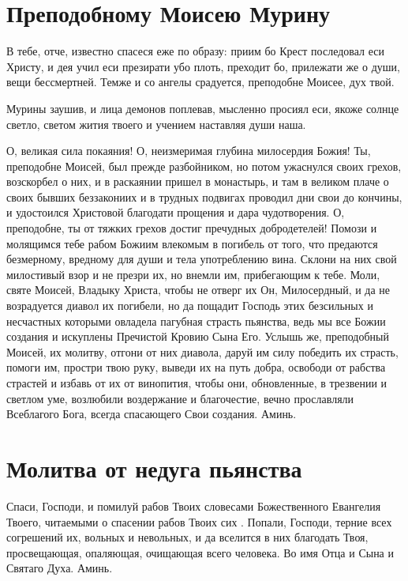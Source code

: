 \section{Преподобному Моисею Мурину}\begin{mymulticols}


В тебе, отче, известно спасеся еже по образу: приим бо Крест последовал еси Христу, и дея учил еси презирати убо плоть, преходит бо, прилежати же о души, вещи бессмертней. Темже и со ангелы срадуется, преподобне Моисее, дух твой.


Мурины заушив, и лица демонов поплевав, мысленно просиял еси, якоже солнце светло, светом жития твоего и учением наставляя души наша.


О, великая сила покаяния! О, неизмеримая глубина милосердия Божия! Ты, преподобне Моисей, был прежде разбойником, но потом ужаснулся своих грехов, возскорбел о них, и в раскаянии пришел в монастырь, и там в великом плаче о своих бывших беззакониих и в трудных подвигах проводил дни свои до кончины, и удостоился Христовой благодати прощения и дара чудотворения. О, преподобне, ты от тяжких грехов достиг пречудных добродетелей! Помози и молящимся тебе рабом Божиим  влекомым в погибель от того, что предаются безмерному, вредному для души и тела употреблению вина. Склони на них свой милостивый взор и не презри их, но внемли им, прибегающим к тебе. Моли, святе Моисей, Владыку Христа, чтобы не отверг их Он, Милосердный, и да не возрадуется диавол их погибели, но да пощадит Господь этих безсильных и несчастных  которыми овладела пагубная страсть пьянства, ведь мы все Божии создания и искуплены Пречистой Кровию Сына Его. Услышь же, преподобный Моисей, их молитву, отгони от них диавола, даруй им силу победить их страсть, помоги им, простри твою руку, выведи их на путь добра, освободи от рабства страстей и избавь от их от винопития, чтобы они, обновленные, в трезвении и светлом уме, возлюбили  воздержание и благочестие, вечно прославляли Всеблагого Бога, всегда спасающего Свои создания. Аминь.

\end{mymulticols}

\section{Молитва от недуга пьянства}\begin{mymulticols}

Спаси, Господи, и помилуй рабов Твоих  словесами Божественного Евангелия Твоего, читаемыми о спасении рабов Твоих сих . Попали, Господи, терние всех согрешений их, вольных и невольных, и да вселится в них благодать Твоя, просвещающая, опаляющая, очищающая всего человека. Во имя Отца и Сына и Святаго Духа. Аминь.

\end{mymulticols}

